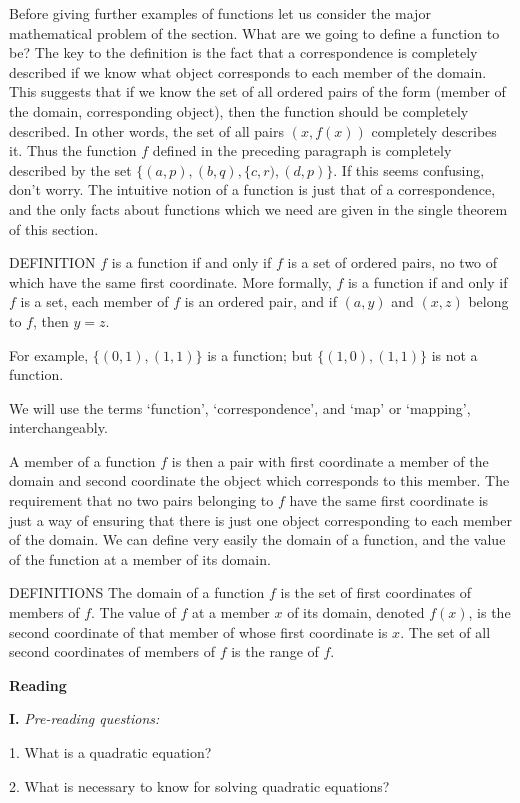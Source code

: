 \documentclass[a4paper]{article}
\newcounter{EUnits}
\newcommand{\EUnit}{\par\medskip{\huge \textbf{Unit \arabic{EUnits}}}\par\stepcounter{EUnits}}
\newcommand{\ESect}[1]{\medskip\par{\large \textbf{#1}}\par}
\newcommand{\ETask}[2]{\medskip\par\textbf{#1.} \textit{#2}\par}
\begin{document}
Before giving further examples of functions let us consider the major mathematical problem of the section. What are we going
to define a function to be? The key to the definition is the fact that a correspondence is completely described if we know
what object corresponds to each member of the domain. This suggests that if we know the set of all ordered pairs of the form
(member of the domain, corresponding object), then the function should be completely described. In other words, the set of all
pairs $(x,f(x))$ completely describes it. Thus the function $f$ defined in the preceding paragraph is completely described by
the set $\{(a, p), (b, q), \{c, r), (d, p)\}$. If this seems confusing, don't worry. The intuitive notion of a function is
just that of a correspondence, and the only facts about functions which we need are given in the single theorem of this section.

DEFINITION $f$ is a function if and only if $f$ is a set of ordered pairs, no two of which have the same first coordinate.
More formally, $f$ is a function if and only if $f$ is a set, each member of $f$ is an ordered pair, and if $(a, y)$ and
$(x, z)$ belong to $f$, then $y = z$.

For example, $\{(0, 1), (1, 1)\}$ is a function; but $\{(1,0), (1, 1)\}$ is not a function.

We will use the terms `function', `correspondence', and `map' or `mapping', interchangeably.

A member of a function $f$ is then a pair with first coordinate a member of the domain and second coordinate the object which
corresponds to this member. The requirement that no two pairs belonging to $f$ have the same first coordinate is just a way of
ensuring that there is just one object corresponding to each member of the domain. We can define very easily the domain of a
function, and the value of the function at a member of its domain.

DEFINITIONS The domain of a function $f$ is the set of first coordinates of members of $f$. The value of $f$ at a member $x$
of its domain, denoted $f(x)$, is the second coordinate of that member of whose first coordinate is $x$. The set of all second
coordinates of members of $f$ is the range of $f$.

\EUnit

\ESect{Reading}
\ETask{I}{Pre-reading questions:}

1. What is a quadratic equation?

2. What is necessary to know for solving quadratic equations?
\end{document}
